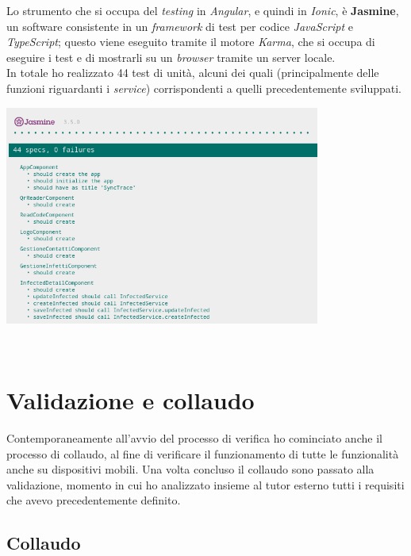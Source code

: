 Lo strumento che si occupa del \textit{testing} in \textit{Angular}, e quindi in \textit{Ionic}, è \textbf{Jasmine}, un software consistente in un \textit{framework} di test per codice \textit{JavaScript} e \textit{TypeScript}; questo viene eseguito tramite il motore \textit{Karma}, che si occupa di eseguire i test e di mostrarli su un \textit{browser} tramite un server locale. \\
In totale ho realizzato 44 test di unità, alcuni dei quali (principalmente delle funzioni riguardanti i \textit{service}) corrispondenti a quelli precedentemente sviluppati. \\

\begin{minipage}{\linewidth}
  \centering
    \includegraphics[height=7.2cm]{immagini/jasminekarma}
\end{minipage} \\



\section{Validazione e collaudo}

Contemporaneamente all'avvio del processo di verifica ho cominciato anche il processo di collaudo, al fine di verificare il funzionamento di tutte le funzionalità anche su dispositivi mobili. Una volta concluso il collaudo sono passato alla validazione, momento in cui ho analizzato insieme al tutor esterno tutti i requisiti che avevo precedentemente definito.

\subsection*{Collaudo}


